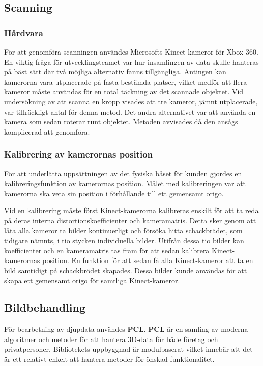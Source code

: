 \documentclass[a4paper,12pt,oneside,final]{extbook}
\begin{document}
\subsection{Scanning}
\subsubsection{Hårdvara}
För att genomföra scanningen användes Microsofts Kinect-kameror för Xbox 360. En viktig fråga för utvecklingsteamet var hur insamlingen av data skulle hanteras på bäst sätt där två möjliga alternativ fanns tillgängliga. Antingen kan kamerorna vara utplacerade på fasta bestämda platser, vilket medför att flera kameror måste användas för en total täckning av det scannade objektet. Vid undersökning av att scanna en kropp visades att tre kameror, jämnt utplacerade, var tillräckligt antal för denna metod. Det andra alternativet var att använda en kamera som sedan roterar runt objektet. Metoden avvisades då den ansågs komplicerad att genomföra.

\subsubsection{Kalibrering av kamerornas position}
För att underlätta uppsättningen av det fysiska båset för kunden gjordes en kalibreringsfunktion av kamerornas position. Målet med kalibreringen var att kamerorna ska veta sin position i förhållande till ett gemensamt origo.

Vid en kalibrering måste först Kinect-kamerorna kalibreras enskilt för att ta reda på deras interna distortionskoefficienter och kameramatris. Detta sker genom att låta alla kameror ta bilder kontinuerligt och försöka hitta schackbrädet, som tidigare nämnts, i tio stycken individuella bilder. Utifrån dessa tio bilder kan koefficienter och en kameramatris tas fram för att sedan kalibrera Kinect-kamerornas position. En funktion för att sedan få alla Kinect-kameror att ta en bild samtidigt på schackbrödet skapades. Dessa bilder kunde användas för att skapa ett gemensamt origo för samtliga Kinect-kameror\cite{kinectextrinc}.

\subsection{Bildbehandling}
För bearbetning av djupdata användes \textbf{PCL}. \textbf{PCL} är en samling av moderna algoritmer och metoder för att hantera 3D-data för både företag och privatpersoner. Bibliotekets uppbyggnad är modulbaserat vilket innebär att det är ett relativt enkelt att hantera metoder för önskad funktionalitet\cite{pcl}.
\end{document}
